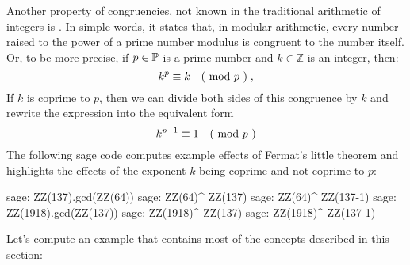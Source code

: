 Another property of congruencies, not known in the traditional arithmetic of integers is \label{fermats-little-theorem}. In simple words, it states that, in modular arithmetic, every number raised to the power of a prime number modulus is congruent to the number itself. Or, to be more precise, if $ p \in \mathbb{P} $ is a prime number and $ k \in \mathbb{Z} $ is an integer, then:
\begin{equation}
k ^ p \equiv k \quad \text{( mod } p \text{ )} \;,
\end{equation}
If $k$ is coprime to $p$, then we can divide both sides of this congruence by $k$ and rewrite the expression into the equivalent form
\begin{equation}
\label{eq_fermat_lt_2}
k ^{p-1} \equiv 1 \quad \text{( mod } p \text{ )}
\end{equation}
The following sage code computes example effects of Fermat's little theorem and highlights the effects of the exponent $k$ being coprime and not coprime to $p$:
\begin{sagecommandline}
sage: ZZ(137).gcd(ZZ(64))
sage: ZZ(64)^ ZZ(137) %
sage: ZZ(64)^ ZZ(137-1) %
sage: ZZ(1918).gcd(ZZ(137))
sage: ZZ(1918)^ ZZ(137) %
sage: ZZ(1918)^ ZZ(137-1) %
\end{sagecommandline}
Let's compute an example that contains most of the concepts described in this section:

